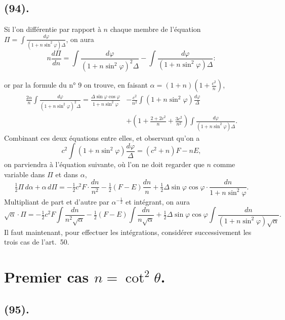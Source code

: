 \documentclass{article}
\begin{document}
\subsection*{(94).}

Si l'on différentie par rapport à $n$ chaque membre de l'équation $\Pi=\displaystyle\int\frac{d\varphi}{(1+n\sin^{2}\varphi)\Delta}$, on aura
\[ n\frac{d\Pi}{dn}=\int\frac{d\varphi}{(1+n\sin^{2}\varphi)^{2}\Delta}-\int\frac{d\varphi}{(1+n\sin^{2}\varphi)\Delta}: \]

or par la formule du n° 9 on trouve, en faisant $\alpha=(1+n)\left(1+\frac{c^{2}}{n}\right)$,
\[ \begin{aligned} \frac{2\alpha}{n}\int\frac{d\varphi}{(1+n\sin^{2}\varphi)^{2}\Delta}=\frac{\Delta\sin\varphi\cos\varphi}{1+n\sin^{2}\varphi}&-\frac{c^{2}}{n^{2}}\int(1+n\sin^{2}\varphi)\frac{d\varphi}{\Delta}\\ &+\left(1+\frac{2+2c^{2}}{n}+\frac{3c^{2}}{n^{2}}\right)\int\frac{d\varphi}{(1+n\sin^{2}\varphi)\Delta}. \end{aligned} \]
Combinant ces deux équations entre elles, et observant qu'on a
\[ c^{2}\int(1+n\sin^{2}\varphi)\frac{d\varphi}{\Delta}=(c^{2}+n)F-nE, \]
on parviendra à l'équation suivante, où l'on ne doit regarder que $n$ comme variable dans $\Pi$ et dans $\alpha$,
\[ \tfrac{1}{2}\Pi\,d\alpha+\alpha\,d\Pi=-\tfrac{1}{2}c^{2}F\cdot\frac{dn}{n^{2}}-\tfrac{1}{2}(F-E)\frac{dn}{n}+\tfrac{1}{2}\Delta\sin\varphi\cos\varphi\cdot\frac{dn}{1+n\sin^{2}\varphi}. \]
Multipliant de part et d'autre par $\alpha^{-\frac{1}{2}}$ et intégrant, on aura
\[ \sqrt{\alpha}\cdot\Pi=-\tfrac{1}{2}c^{2}F\int\frac{dn}{n^{2}\sqrt{\alpha}}-\tfrac{1}{2}(F-E)\int\frac{dn}{n\sqrt{\alpha}}+\tfrac{1}{2}\Delta\sin\varphi\cos\varphi\int\frac{dn}{(1+n\sin^{2}\varphi)\sqrt{\alpha}}. \]
Il faut maintenant, pour effectuer les intégrations, considérer successivement les trois cas de l'art.\ 50.

\section*{Premier cas $n=\cot^{2}\theta$.}

\subsection*{(95).}
\end{document}

